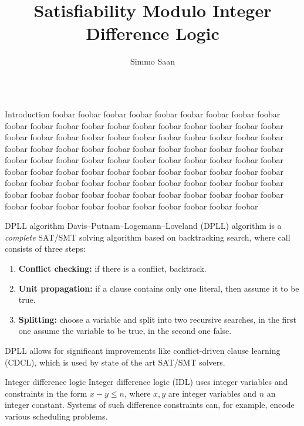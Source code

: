 \documentclass{beamer}
\title{Satisfiability Modulo Integer Difference Logic}
\author{Simmo Saan}
\institute{Institute of Computer Science, University of Tartu}
\date{}
\begin{document}
\begin{frame}[fragile,t]
\maketitle

\begin{columns}[t,onlytextwidth]
	\begin{column}{0.485\textwidth}
		\begin{block}{Introduction}
			foobar foobar foobar foobar foobar foobar foobar foobar foobar foobar foobar foobar foobar foobar foobar foobar foobar foobar foobar foobar foobar foobar foobar foobar foobar foobar foobar foobar foobar foobar foobar foobar foobar foobar foobar foobar foobar foobar foobar foobar foobar foobar foobar foobar foobar foobar foobar foobar foobar foobar foobar foobar foobar foobar foobar foobar foobar foobar foobar foobar foobar foobar foobar foobar foobar foobar foobar foobar foobar foobar foobar foobar foobar foobar foobar foobar foobar foobar foobar foobar foobar foobar foobar foobar foobar foobar foobar foobar foobar foobar foobar foobar foobar foobar foobar foobar
		\end{block}
	
		\begin{block}{DPLL algorithm}
			Davis–Putnam–Logemann–Loveland (DPLL) algorithm is a \emph{complete} SAT/SMT solving algorithm based on backtracking search, where call consists of three steps:
			\begin{enumerate}
				\item \textbf{Conflict checking:} if there is a conflict, backtrack.
				\item \textbf{Unit propagation:} if a clause contains only one literal, then assume it to be true.
				\item \textbf{Splitting:} choose a variable and split into two recursive searches, in the first one assume the variable to be true, in the second one false.
			\end{enumerate}
		
			DPLL allows for significant improvements like conflict-driven clause learning (CDCL), which is used by state of the art SAT/SMT solvers.
		\end{block}
	
		\begin{block}{Integer difference logic}
			Integer difference logic (IDL) uses integer variables and constraints in the form $x - y \leq n$, where $x, y$ are integer variables and $n$ an integer constant. Systems of such difference constraints can, for example, encode various scheduling problems.
			

\end{block}
\end{column}
\end{columns}
\end{frame}
\end{document}
